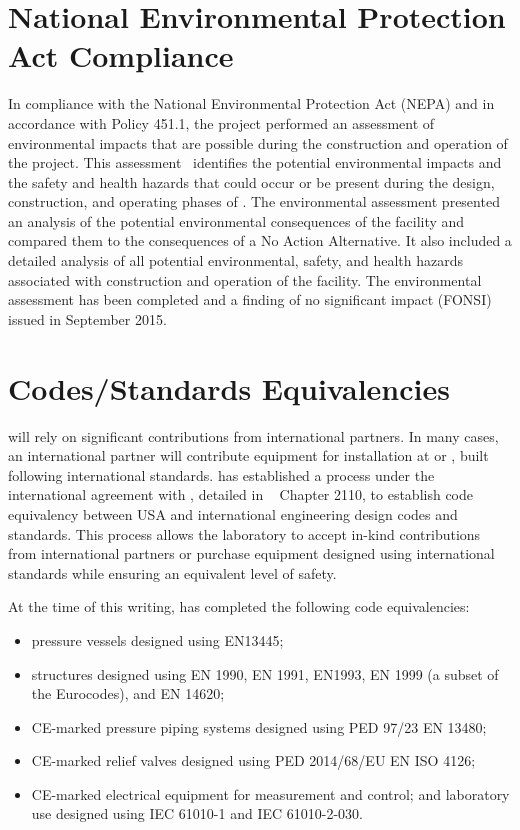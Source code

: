 \section{National Environmental Protection Act Compliance}

In compliance with the National Environmental Protection Act (NEPA) and in
accordance with  Policy 451.1, the
 project performed an assessment  of %
environmental impacts that are possible during the construction and operation of the
project.  %
This assessment~\cite{bib:docdb122}   identifies the
potential environmental impacts and the safety and health hazards
that could occur or be present during the design, construction, and operating phases of
.  The environmental assessment presented an
analysis of the potential environmental consequences of the facility
and compared them to the consequences of a No Action Alternative. %
It also included a detailed analysis of all potential environmental,
safety, and health hazards associated with construction and operation
of the facility.  The environmental assessment has been completed and
a finding of no significant impact (FONSI)~\cite{bib:docdb122} issued in September 2015.


\section{Codes/Standards Equivalencies}
\label{sec:esh_codes}

 will rely on significant contributions from international
partners. In many cases, an international partner will contribute
equipment for installation at  or , built
following international standards.  has established a
process under the international agreement with , detailed
in ~\cite{FNAL:FESHM2000} Chapter 2110, to establish code equivalency between
USA and international engineering design codes and standards. This
process allows the laboratory to accept in-kind contributions from
international partners or purchase equipment designed using
international standards while ensuring an equivalent level
of safety.

At the time of this writing,  has completed the following code
equivalencies:
\begin{itemize}
 \item pressure vessels designed using EN13445;
 \item structures designed using EN 1990, EN 1991, EN1993, EN 1999 (a
   subset of the Eurocodes), and EN 14620;
 \item CE-marked pressure piping systems designed using PED 97/23 EN 13480;
 \item CE-marked relief valves designed using PED 2014/68/EU EN ISO 4126;
 \item CE-marked electrical equipment for measurement and control; and
   laboratory use designed using IEC 61010-1 and IEC 61010-2-030.
\end{itemize}

